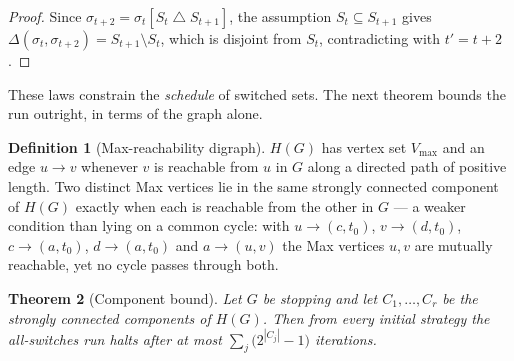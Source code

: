 \documentclass[11pt]{article}
\theoremstyle{plain}
\newtheorem{theorem}{Theorem}[section]
\theoremstyle{definition}
\newtheorem{definition}[theorem]{Definition}
\newcommand{\Vmax}{V_{\max}}
\begin{document}
\begin{proof}
Since $\sigma_{t+2}=\sigma_t[S_t\bigtriangleup S_{t+1}]$, the assumption
$S_t\subseteq S_{t+1}$ gives
$\Delta(\sigma_t,\sigma_{t+2})=S_{t+1}\setminus S_t$, which is disjoint
from $S_t$, contradicting  with $t'=t+2$.
\end{proof}

These laws constrain the \emph{schedule} of switched sets. The next
theorem bounds the run outright, in terms of the graph alone.

\begin{definition}[Max-reachability digraph]\label{def:maxreach}
$H(G)$ has vertex set $\Vmax$ and an edge $u\to v$ whenever $v$ is
reachable from $u$ in $G$ along a directed path of positive length. Two
distinct Max vertices lie in the same strongly connected component of
$H(G)$ exactly when each is reachable from the other in $G$ --- a weaker
condition than lying on a common cycle: with $u\to(c,t_0)$, $v\to(d,t_0)$,
$c\to(a,t_0)$, $d\to(a,t_0)$ and $a\to(u,v)$ the Max vertices $u,v$ are
mutually reachable, yet no cycle passes through both.
\end{definition}

\begin{theorem}[Component bound]\label{thm:component-bound}
Let $G$ be stopping and let $C_1,\dots,C_r$ be the strongly connected
components of $H(G)$. Then from every initial strategy the all-switches
run halts after at most $\sum_{j}\bigl(2^{|C_j|}-1\bigr)$ iterations.
\end{theorem}
\end{document}
